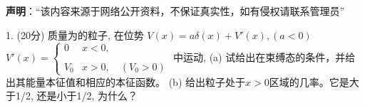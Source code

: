 
\textbf{声明}：“该内容来源于网络公开资料，不保证真实性，如有侵权请联系管理员”

1. (20分) 质量为的粒子, 在位势
$V(x) = a \delta (x) + V'(x), (a < 0)$
$V'(x) = \begin{cases} 0 & x < 0, \\\\ V_0 & x > 0, \quad (V_0 > 0)\end{cases}$
中运动,
(a) 试给出在束缚态的条件，并给出其能量本征值和相应的本征函数。
(b) 给出粒子处于$ x > 0 $区域的几率。它是大于1/2, 还是小于1/2, 为什么？
